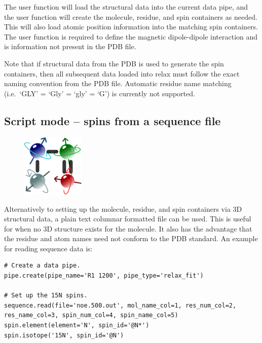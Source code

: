 The  user function will load the structural data into the current data pipe, and the  user function will create the molecule, residue, and spin containers as needed.
This will also load atomic position information into the matching spin containers.
The  user function is required to define the magnetic dipole-dipole interaction and is information not present in the PDB file.

Note that if structural data from the PDB is used to generate the spin containers, then all subsequent data loaded into relax must follow the exact naming convention from the PDB file.
Automatic residue name matching (i.e.\ `GLY' = `Gly' = `gly' = `G') is currently not supported.




\subsection{Script mode -- spins from a sequence file} \label{sect: script - sequence file}

\begin{figure}[h]
  \includegraphics[width=3cm, bb=0 0 1701 1701]{graphics/misc/sequence_600x600}
\end{figure}

Alternatively to setting up the molecule, residue, and spin containers via 3D structural data, a plain text columnar formatted file can be used.
This is useful for when no 3D structure exists for the molecule.
It also has the advantage that the residue and atom names need not conform to the PDB standard.
An example for reading sequence data is:

\begin{lstlisting}
# Create a data pipe.
pipe.create(pipe_name='R1 1200', pipe_type='relax_fit')

# Set up the 15N spins.
sequence.read(file='noe.500.out', mol_name_col=1, res_num_col=2, res_name_col=3, spin_num_col=4, spin_name_col=5)
spin.element(element='N', spin_id='@N*')
spin.isotope('15N', spin_id='@N')
\end{lstlisting}

